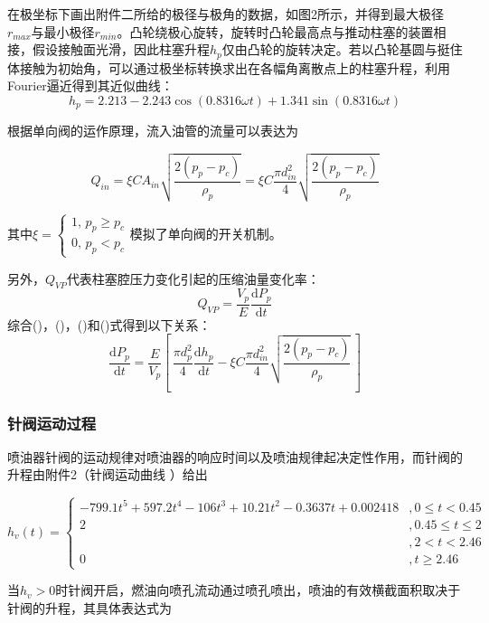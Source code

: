 \documentclass[withoutpreface,bwprint]{cumcmthesis} %
\begin{document}
			在极坐标下画出附件二所给的极径与极角的数据，如图2所示，并得到最大极径$r_{max}$与最小极径$r_{min}$。凸轮绕极心旋转，旋转时凸轮最高点与推动柱塞的装置相接，假设接触面光滑，因此柱塞升程$h_p$仅由凸轮的旋转决定。若以凸轮基圆与挺住体接触为初始角，可以通过极坐标转换求出在各幅角离散点上的柱塞升程，利用Fourier逼近得到其近似曲线：
			\begin{equation}h_p = 2.213 - 2.243 \cos(0.8316 \omega t) + 1.341 \sin(0.8316 \omega t)\end{equation}
			
			根据单向阀的运作原理，流入油管的流量可以表达为
			
			\begin{equation}Q_{in} = \xi CA_{in} \sqrt{\frac{2(p_p - p_c)}{\rho_p}} = \xi C \frac{\pi d_{in}^2}{4} \sqrt{\frac{2(p_p - p_c)}{\rho_p}}\end{equation}
			
			其中$\xi = \left\{ \begin{aligned}  1, \, p_p \geq p_c \\ 0, \, p_p < p_c \end{aligned} \right.$模拟了单向阀的开关机制。
			
			另外，$Q_{VP}$代表柱塞腔压力变化引起的压缩油量变化率：
			$$
			Q_{VP} = \frac{V_p}{E} \frac{\mathrm{d}P_p}{\mathrm{d}t}
			$$
			综合()，()，()和()式得到以下关系：
			$$
			\frac{\mathrm{d}P_p}{\mathrm{d}t} = \frac{E}{V_p} \left[ \, \frac{\pi d_p^2}{4}  \frac{\mathrm{d}h_p}{\mathrm{d}t} - \xi C \frac{\pi d_{in}^2}{4} \sqrt{\frac{2(p_p - p_c)}{\rho_p}} \, \right]
			$$
			
			
			\subsubsection{针阀运动过程}
			
			喷油器针阀的运动规律对喷油器的响应时间以及喷油规律起决定性作用，而针阀的升程由附件2（针阀运动曲线 ）给出
			
			\begin{equation}h_v(t) = \left\{ \begin{array}{ll}-799.1 t^5 + 597.2 t^4 - 106 t^3 + 10.21 t^2 -  0.3637 t + 0.002418 &, 0 \leq t < 0.45 \\2 &, 0.45 \leq t \leq 2 \\ &, 2 < t < 2.46 \\0 &, t \geq 2.46\end{array} \right.\end{equation}
			
			当$h_v > 0$时针阀开启，燃油向喷孔流动通过喷孔喷出，喷油的有效横截面积取决于针阀的升程，其具体表达式为
			
\end{document}
